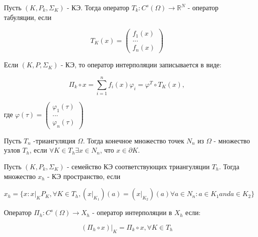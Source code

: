 \documentclass[__main__.tex]{subfiles}
\begin{document}
\begin{definition}
	Пусть $\left(K, P_k, \Sigma_K\right)$ - КЭ. Тогда оператор $T_k: C^s\left(\Omega\right) \rightarrow \mathbb{R}^N$  - оператор табуляции, если 
	
	$$
	T_K \left(x\right) = 
	\left(
	\begin{matrix}
	f_1\left(x\right) \\
	... \\
	f_n\left(x\right)
	\end{matrix}
	\right)
	$$
	
	Если $\left(K, P, \Sigma_K\right)$ - КЭ, то оператор интерполяции записывается в виде:
	
	$$
	\Pi_k \circ x = \sum_{i = 1}^{n} f_i\left(x\right) \varphi_i = \varphi^T \circ T_K\left(x\right),
	$$
	
	где $\varphi\left(\tau\right) = \left(\begin{matrix}
	\varphi_1\left(\tau\right) \\
	... \\
	\varphi_n \left(\tau\right)
	\end{matrix}\right)$
\end{definition}

\begin{definition}
	Пусть $T_n$ -триангуляция $\Omega$. Тогда конечное множество точек $N_n$ из $\Omega$ - множество узлов $T_h$, если $\forall K \in T_h \exists x \in N_n$, что $x \in \partial K$.
\end{definition}

\begin{definition}
Пусть $\left(K, P_k, \Sigma_K\right)$ - семейство КЭ соответствующих триангуляции $T_h$. Тогда множество $x_h$ - КЭ пространство, если 

$$
x_h = \{x: x\big|_K P_K, \forall K \in T_h, \left(x\big|_{K_1}\right)\left(a\right) = \left(x\big|_{K_2}\right)\left(a\right) \forall a \in N_n: a\in K_1 and a\in K_2 \}
$$
\end{definition}

\begin{definition}
	Оператор $\Pi_h: C^s \left(\Omega\right) \rightarrow X_h$ - оператор интерполяции в $X_h$ если:
	
	$$
	\left(\Pi_h \circ x\right)\big|_K = \Pi_k \circ x, \forall K \in T_h
	$$
\end{definition}
\end{document}

